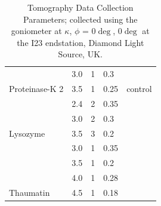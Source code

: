 \begin{table}[h]
{\begin{tabular}{@{}lllll@{}}
                                 & 3.0    & 1             & 0.3                           &                                \\
\multirow{-2}{*}{Proteinase-K 2} & 3.5    & 1             & 0.25                          & \multirow{-2}{*}{control}      \\
                                 & 2.4    & 2             & 0.35                          &                                \\
                                 & 3.0    & 2             & 0.3                           &                                \\
\multirow{-3}{*}{Lysozyme}       & 3.5    & 3             & 0.2                           &                                \\
                                 & 3.0    & 1             & 0.35                          &                                \\
                                 & 3.5    & 1             & 0.2                           &                                \\
                                 & 4.0    & 1             & 0.28                          &                                \\
\multirow{-4}{*}{Thaumatin}      & 4.5    & 1             & 0.18                          &       \\
\bottomrule
\end{tabular}%
}

\caption{Tomography Data Collection Parameters; collected using the goniometer at $\kappa$, $\phi$ = 0$\deg$, 0$\deg$ at the I23 endstation, Diamond Light Source, UK.}
\label{tomo_table}
\end{table}




